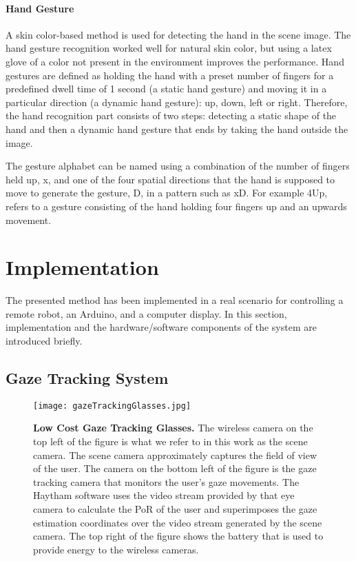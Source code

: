 \documentclass[jou,a4paper,notxfonts]{apa}
\begin{document}
\paragraph{Hand Gesture}
A skin color-based method is used for detecting the hand in the scene image. The hand gesture recognition worked well for natural skin color, but using a latex glove of a color not present in the environment improves the performance. Hand gestures are defined as holding the hand with a preset number of fingers for a predefined dwell time of 1 second (a static hand gesture) and moving it in a particular direction (a dynamic hand gesture): up, down, left  or right. Therefore, the hand recognition part consists of two steps: detecting a static shape of the hand and then a dynamic hand gesture that ends by taking the hand outside the image.
 
The gesture alphabet can be named using a combination of the number of fingers held up, x, and one of the four spatial directions that the hand is supposed to move to generate the gesture, D, in a pattern such as xD. For example 4Up, refers to a gesture consisting of the hand holding four fingers up and an upwards movement.

\section{Implementation}

The presented method has been implemented in a real scenario for controlling a remote robot, an Arduino, and a computer display. In this section, implementation and the hardware/software components of the system are introduced briefly. 

\subsection{Gaze Tracking System}

\begin{figure}[tp]
 \texttt{[image: gazeTrackingGlasses.jpg]}
 \caption{\textbf{Low Cost Gaze Tracking Glasses.} The wireless camera on the top left of the figure is what we refer to in this work as the scene camera. The scene camera approximately captures the field of view of the user. The camera on the bottom left of the figure is the gaze tracking camera that monitors the user's gaze movements. The Haytham software uses the video stream provided by that eye camera to calculate the PoR of the user and superimposes the gaze estimation coordinates over the  video stream generated by the scene camera. The top right of the figure shows the battery that is used to provide energy to the wireless cameras.}
 \label{gazeTrackingGlasses}
\end{figure}
\end{document}

